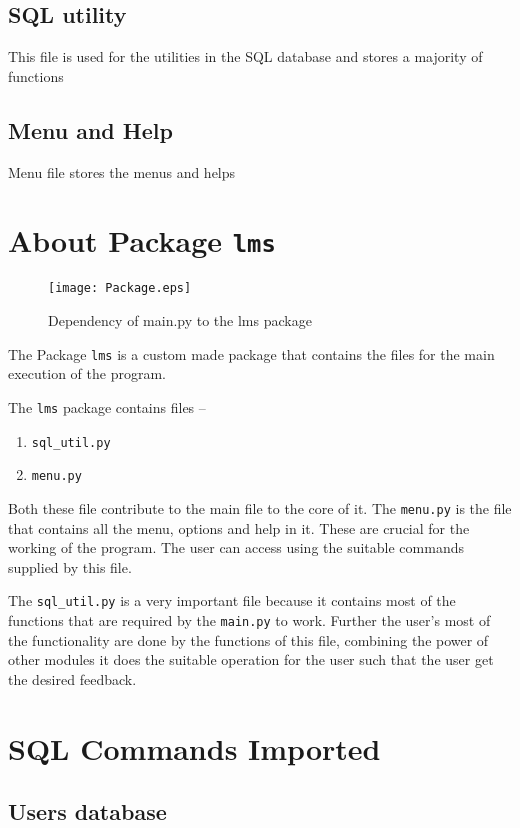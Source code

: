 \documentclass[12pt, a4paper, titlepage, openany]{report}
\begin{document}
\subsection{SQL utility}

This file is used for the utilities in the SQL database and stores a majority of functions\par


\newpage
\subsection{Menu and Help}

Menu file stores the menus and helps\par


\newpage
\section{About Package \texttt{lms}}
\begin{figure}
\centering
\texttt{[image: Package.eps]}
\caption{Dependency of main.py to the lms package}
\end{figure}

The Package \verb+lms+ is a custom made package that contains the files for the main execution of the program.

The \verb+lms+ package contains files --
\begin{enumerate}\item \verb+sql_util.py+ \item \verb+menu.py+ \end{enumerate}
Both these file contribute to the main file to the core of it. The \verb+menu.py+ is the file that contains all the menu, options and help in it. These are crucial for the working of the program. The user can access using the suitable commands supplied by this file.

The \verb+sql_util.py+ is a very important file because it contains most of the functions that are required by the \verb+main.py+ to work. Further the user's most of the functionality are done by the functions of this file, combining the power of other modules it does the suitable operation for the user such that the user get the desired feedback.

\section{SQL Commands Imported}
\subsection{Users database}

\newpage
\end{document}
